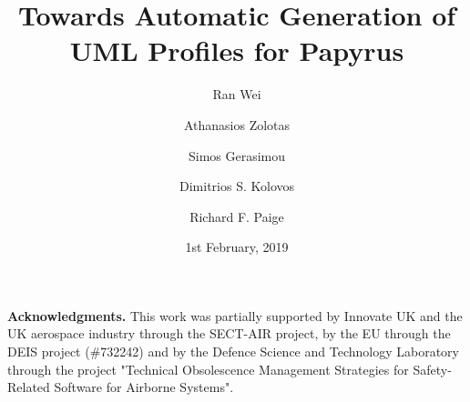 \documentclass[global]{svjour}
\begin{document}
\title{Towards Automatic Generation of \\ UML Profiles for Papyrus}

\author{Ran Wei \and Athanasios Zolotas \and Simos Gerasimou \and Dimitrios S. Kolovos \and Richard F. Paige
	}

\date{1st February, 2019}
\maketitle{}










\noindent\textbf{Acknowledgments.}
This work was partially supported by Innovate UK and the UK aerospace industry 
through the SECT-AIR project, by the EU through the DEIS project (\#732242) and 
by the Defence Science and Technology Laboratory through the project "Technical 
Obsolescence Management Strategies for Safety-Related Software for Airborne 
Systems".

\clearpage


\end{document}
